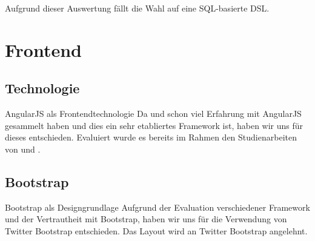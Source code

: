 Aufgrund dieser Auswertung fällt die Wahl auf eine SQL-basierte DSL.

\section{Frontend}
\subsection{Technologie}
\begin{decision}[label=dec:frontend:technology]{AngularJS als Frontendtechnologie}
Da \chuf und \fscf schon viel Erfahrung mit AngularJS gesammelt haben und dies ein sehr etabliertes Framework ist, haben wir uns für dieses entschieden. Evaluiert wurde es bereits im Rahmen den Studienarbeiten von \fscf und \rlif.
\end{decision}
\subsection{Bootstrap}
\begin{decision}[label=dec:frontend:bootstrap]{Bootstrap als Designgrundlage}
Aufgrund der Evaluation verschiedener Framework und der Vertrautheit mit Bootstrap, haben wir uns für die Verwendung von Twitter Bootstrap entschieden. Das Layout wird an Twitter Bootstrap angelehnt.
\end{decision}


